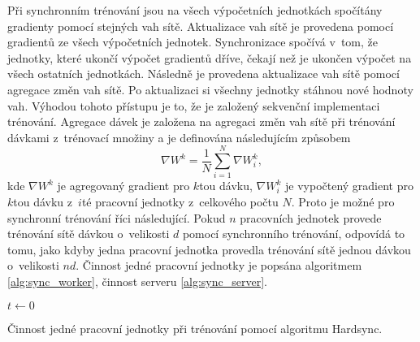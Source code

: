 Při synchronním trénování jsou na všech výpočetních jednotkách spočítány gradienty pomocí stejných vah sítě.
Aktualizace vah sítě je provedena pomocí gradientů ze všech výpočetních jednotek.
Synchronizace spočívá v~tom, že jednotky, které ukončí výpočet gradientů dříve, čekají než je ukončen výpočet na všech ostatních jednotkách.
Následně je provedena aktualizace vah sítě pomocí agregace změn vah sítě.
Po aktualizaci si všechny jednotky stáhnou nové hodnoty vah.
Výhodou tohoto přístupu je to, že je založený sekvenční implementaci trénování.
Agregace dávek je založena na agregaci změn vah sítě při trénování dávkami z~trénovací množiny a je definována následujícím způsobem \begin{equation}\nabla W^{k}=\frac{1}{N}\sum_{i=1}^{N}{\nabla W^{k}_{i}},\label{eq:grad_agr}\end{equation} kde $\nabla W^{k}$ je agregovaný gradient pro $k$tou dávku, $\nabla W^{k}_{i}$ je vypočtený gradient pro $k$tou dávku z~$i$té pracovní jednotky z~celkového počtu $N$.
Proto je možné pro synchronní trénování říci následující.
Pokud $n$ pracovních jednotek provede trénování sítě dávkou o~velikosti $d$ pomocí synchronního trénování, odpovídá to tomu, jako kdyby jedna pracovní jednotka provedla trénování sítě jednou dávkou o~velikosti $nd$.
Činnost jedné pracovní jednotky je popsána algoritmem \ref{alg:sync_worker}, činnost serveru \ref{alg:sync_server}.

\begin{algorithm}
    \SetAlgoLined
    $t \leftarrow 0$\\
\caption{Činnost jedné pracovní jednotky při trénování pomocí algoritmu Hardsync.}
\label{alg:sync_worker}
\end{algorithm}

